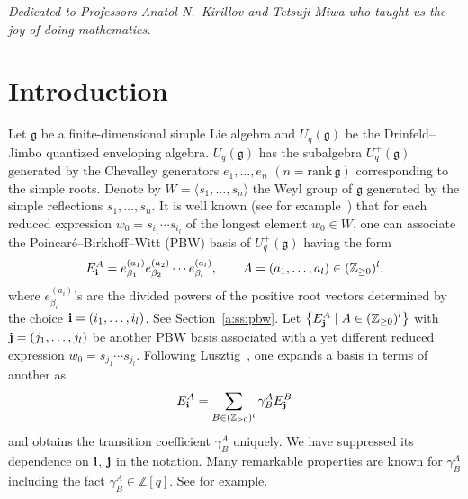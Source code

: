 \documentclass[pdftex]{sigma}
\newcommand{\geh}{\mathfrak{g}}
\newcommand{\Z}{{\mathbb Z}}
\begin{document}


\begin{flushright}
\begin{minipage}{80mm}
\it Dedicated to Professors Anatol N.~Kirillov and Tetsuji Miwa who taught us the joy of
doing mathematics.
\end{minipage}
\end{flushright}

\renewcommand{\thefootnote}{\arabic{footnote}}
\setcounter{footnote}{0}

\section{Introduction}\label{a:sec1}

Let $\geh$ be a f\/inite-dimensional simple Lie algebra and
$U_q(\geh)$ be the Drinfeld--Jimbo quantized enveloping algebra.
$U_q(\geh)$ has the subalgebra $U^+_q(\geh)$ generated by the
Chevalley generators $e_1,\ldots, e_n$   $(n= \mathrm{rank}\, \geh)$
corresponding to the simple roots.
Denote by $W=\langle s_1,\ldots, s_n\rangle$ the
Weyl group of $\geh$ generated by the simple ref\/lections $s_1,\ldots, s_n$.
It is well known (see for example~\cite{L2}) that
for each reduced expression $w_0 = s_{i_1}\cdots s_{i_l}$
of the longest element $w_0 \in W$,
one can associate the Poincar\'e--Birkhof\/f--Witt (PBW) basis
of $U^+_q(\geh)$ having the form
\begin{gather*}
E_{\bf i}^A=e_{\beta_1}^{(a_1)}e_{\beta_2}^{(a_2)}\cdots e_{\beta_l}^{(a_l)},
\qquad
A=(a_1,\ldots, a_l) \in (\Z_{\ge 0})^l,
\end{gather*}
where $e^{(a_i)}_{\beta_i}$'s are the divided powers of the positive root
vectors determined by the choice ${\bf i}= (i_1,\ldots, i_l)$.
See Section~\ref{a:ss:pbw}.
Let $\big\{E^A_{\bf j}\mid A \in (\Z_{\ge 0})^l\big\}$ with
${\bf j} = (j_1,\ldots, j_l)$ be another
PBW basis associated with a yet dif\/ferent reduced expression
$w_0 = s_{j_1}\cdots s_{j_l}$.
Following Lusztig~\cite{L}, one expands
a basis in terms of another as
\begin{gather*}
E^A_{\bf i} = \sum_{B \in (\Z_{\ge 0})^l}
\gamma^A_B E^B_{\bf j}
\end{gather*}
and obtains the
transition coef\/f\/icient $\gamma^A_B$ uniquely.
We have suppressed its dependence on ${\bf i}$, ${\bf j}$
in the notation.
Many remarkable properties are known for $\gamma^A_B$
including the fact $\gamma^A_B \in \Z[q]$.
See \cite[Proposition~2.3]{L} for example.
\end{document}
